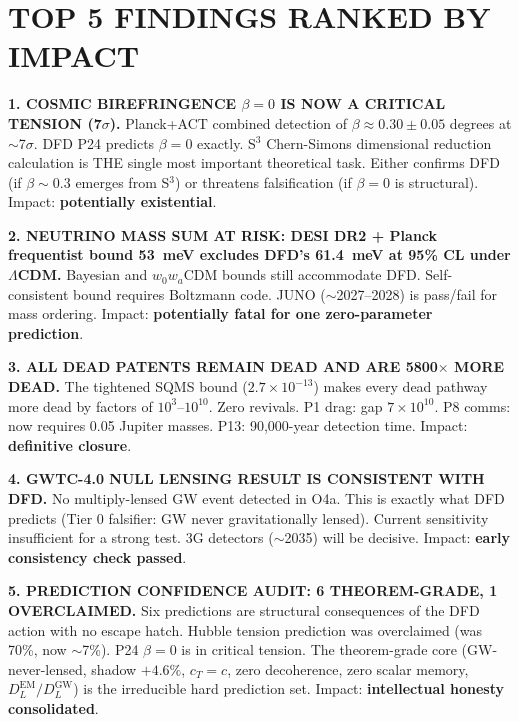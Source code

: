 \documentclass[11pt]{article}
\begin{document}
\section*{TOP 5 FINDINGS RANKED BY IMPACT}

\begin{tcolorbox}[colback=blue!5!white, colframe=blue!70!black,
  title=\textbf{W4i19 TOP 5 FINDINGS}]

\textbf{1. COSMIC BIREFRINGENCE $\beta = 0$ IS NOW A CRITICAL TENSION (7$\sigma$).}
Planck+ACT combined detection of $\beta \approx 0.30 \pm 0.05$ degrees at $\sim$7$\sigma$.
DFD P24 predicts $\beta = 0$ exactly. S$^3$ Chern-Simons dimensional reduction calculation
is THE single most important theoretical task. Either confirms DFD (if $\beta \sim 0.3$
emerges from S$^3$) or threatens falsification (if $\beta = 0$ is structural). Impact:
\textbf{potentially existential}.

\textbf{2. NEUTRINO MASS SUM AT RISK: DESI DR2 + Planck frequentist bound 53~meV excludes
DFD's 61.4~meV at 95\% CL under $\Lambda$CDM.} Bayesian and $w_0w_a$CDM bounds still
accommodate DFD. Self-consistent bound requires Boltzmann code. JUNO ($\sim$2027--2028)
is pass/fail for mass ordering. Impact: \textbf{potentially fatal for one zero-parameter prediction}.

\textbf{3. ALL DEAD PATENTS REMAIN DEAD AND ARE 5800$\times$ MORE DEAD.}
The tightened SQMS bound ($2.7 \times 10^{-13}$) makes every dead pathway more dead
by factors of $10^3$--$10^{10}$. Zero revivals. P1 drag: gap $7 \times 10^{10}$.
P8 comms: now requires 0.05 Jupiter masses. P13: 90,000-year detection time. Impact:
\textbf{definitive closure}.

\textbf{4. GWTC-4.0 NULL LENSING RESULT IS CONSISTENT WITH DFD.}
No multiply-lensed GW event detected in O4a. This is exactly what DFD predicts
(Tier 0 falsifier: GW never gravitationally lensed). Current sensitivity insufficient
for a strong test. 3G detectors ($\sim$2035) will be decisive. Impact:
\textbf{early consistency check passed}.

\textbf{5. PREDICTION CONFIDENCE AUDIT: 6 THEOREM-GRADE, 1 OVERCLAIMED.}
Six predictions are structural consequences of the DFD action with no escape hatch.
Hubble tension prediction was overclaimed (was 70\%, now $\sim$7\%). P24 $\beta = 0$ is
in critical tension. The theorem-grade core (GW-never-lensed, shadow $+4.6\%$,
$c_T = c$, zero decoherence, zero scalar memory, $D_L^\text{EM}/D_L^\text{GW}$)
is the irreducible hard prediction set. Impact: \textbf{intellectual honesty consolidated}.

\end{tcolorbox}
\end{document}
